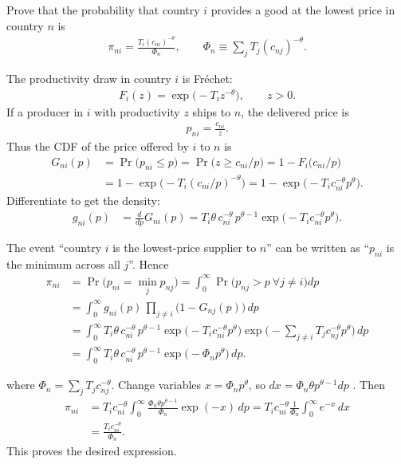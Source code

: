 Prove that the probability that country $i$ provides a good at the lowest price in country $n$ is
\begin{align*}
\pi_{ni} = \frac{T_i (c_{ni})^{-\theta}}{\Phi_n},
\qquad
\Phi_n \equiv \sum_j T_j (c_{nj})^{-\theta}.
\end{align*}

\begin{solution}
The productivity draw in country $i$ is Fr\'echet:
\begin{align*}
F_i(z) = \exp\big(-T_i z^{-\theta}\big), \qquad z>0.
\end{align*}
If a producer in $i$ with productivity $z$ ships to $n$, the delivered price is
\begin{align*}
p_{ni}=\frac{c_{ni}}{z}.
\end{align*}
Thus the CDF of the price offered by $i$ to $n$ is
\begin{align*}
G_{ni}(p)
&= \Pr\big(p_{ni}\le p\big)
= \Pr\big(z \ge c_{ni}/p\big)
= 1 - F_i\!\big(c_{ni}/p\big) \\
&= 1 - \exp\!\big(-T_i (c_{ni}/p)^{-\theta}\big)
= 1 - \exp\!\big(-T_i c_{ni}^{-\theta} p^{\theta}\big).
\end{align*}
Differentiate to get the density:
\begin{align*}
g_{ni}(p)
&= \frac{d}{dp}G_{ni}(p)
= T_i \theta\, c_{ni}^{-\theta}\, p^{\theta-1}
    \exp\!\big(-T_i c_{ni}^{-\theta} p^{\theta}\big).
\end{align*}

The event ``country $i$ is the lowest-price supplier to $n$'' can be written as
``$p_{ni}$ is the minimum across all $j$''. Hence
\begin{align*}
\pi_{ni}
&= \Pr\big(p_{ni} = \min_j p_{nj}\big)
= \int_0^\infty \Pr\big(p_{nj}>p\ \forall j\neq i\big) dp \\
&= \int_0^\infty g_{ni}(p)\, \prod_{j\neq i}\big(1-G_{nj}(p)\big)\, dp \\
&= \int_0^\infty T_i \theta\, c_{ni}^{-\theta}\, p^{\theta-1}
    \exp\!\big(-T_i c_{ni}^{-\theta} p^{\theta}\big)
    \exp\!\Big(-\sum_{j\neq i} T_j c_{nj}^{-\theta} p^{\theta}\Big)\, dp \\
&= \int_0^\infty T_i \theta\, c_{ni}^{-\theta}\, p^{\theta-1}
    \exp\!\big(-\Phi_n p^{\theta}\big)\, dp.
\end{align*}

where $\Phi_n = \sum_j T_j c_{nj}^{-\theta}$. Change variables $x=\Phi_n p^{\theta}$, so $dx = \Phi_n \theta p^{\theta-1} dp$ . Then
\begin{align*}
\pi_{ni}
&= T_i c_{ni}^{-\theta} \int_0^\infty \frac{\Phi_n \theta p^{\theta-1}}{\Phi_n}
    \exp(-x)\, dp
= T_i c_{ni}^{-\theta} \frac{1}{\Phi_n}\int_0^\infty e^{-x}\, dx \\
&= \frac{T_i c_{ni}^{-\theta}}{\Phi_n}.
\end{align*}
This proves the desired expression.
\end{solution}
